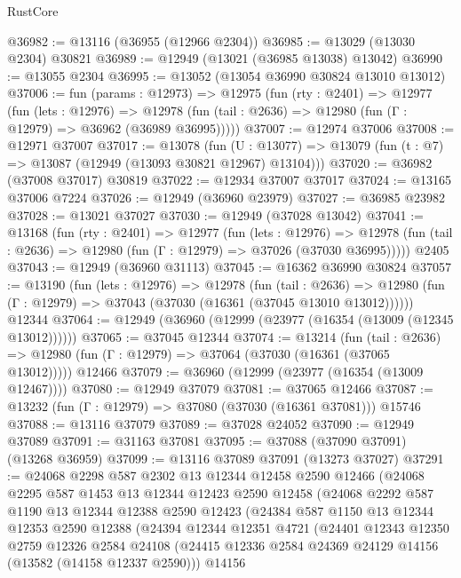 \begin{lexlean}{RustCore}
\begin{coremodule}
@36982 := @13116 (@36955 (@12966 @2304))
@36985 := @13029 (@13030 @2304) @30821
@36989 := @12949 (@13021 (@36985 @13038) @13042)
@36990 := @13055 @2304
@36995 := @13052 (@13054 @36990 @30824 @13010 @13012)
@37006 := fun (params : @12973) =>
  @12975
    (fun (rty : @2401) =>
    @12977
      (fun (lets : @12976) =>
      @12978 (fun (tail : @2636) => @12980 (fun (Γ : @12979) => @36962 (@36989 @36995)))))
@37007 := @12974 @37006
@37008 := @12971 @37007
@37017 := @13078
    (fun (U : @13077) => @13079 (fun (t : @7) => @13087 (@12949 (@13093 @30821 @12967) @13104)))
@37020 := @36982 (@37008 @37017) @30819
@37022 := @12934 @37007 @37017
@37024 := @13165 @37006 @7224
@37026 := @12949 (@36960 @23979)
@37027 := @36985 @23982
@37028 := @13021 @37027
@37030 := @12949 (@37028 @13042)
@37041 := @13168
    (fun (rty : @2401) =>
    @12977
      (fun (lets : @12976) =>
      @12978 (fun (tail : @2636) => @12980 (fun (Γ : @12979) => @37026 (@37030 @36995)))))
    @2405
@37043 := @12949 (@36960 @31113)
@37045 := @16362 @36990 @30824
@37057 := @13190
    (fun (lets : @12976) =>
    @12978
      (fun (tail : @2636) =>
      @12980 (fun (Γ : @12979) => @37043 (@37030 (@16361 (@37045 @13010 @13012))))))
    @12344
@37064 := @12949 (@36960 (@12999 (@23977 (@16354 (@13009 (@12345 @13012))))))
@37065 := @37045 @12344
@37074 := @13214
    (fun (tail : @2636) => @12980 (fun (Γ : @12979) => @37064 (@37030 (@16361 (@37065 @13012)))))
    @12466
@37079 := @36960 (@12999 (@23977 (@16354 (@13009 @12467))))
@37080 := @12949 @37079
@37081 := @37065 @12466
@37087 := @13232 (fun (Γ : @12979) => @37080 (@37030 (@16361 @37081))) @15746
@37088 := @13116 @37079
@37089 := @37028 @24052
@37090 := @12949 @37089
@37091 := @31163 @37081
@37095 := @37088 (@37090 @37091) (@13268 @36959)
@37099 := @13116 @37089 @37091 (@13273 @37027)
@37291 := @24068
    @2298
    @587
    @2302
    @13
    @12344
    @12458
    @2590
    @12466
    (@24068
      @2295
      @587
      @1453
      @13
      @12344
      @12423
      @2590
      @12458
      (@24068
        @2292
        @587
        @1190
        @13
        @12344
        @12388
        @2590
        @12423
        (@24384
          @587
          @1150
          @13
          @12344
          @12353
          @2590
          @12388
          (@24394
            @12344
            @12351
            @4721
            (@24401
              @12343
              @12350
              @2759
              @12326
              @2584
              @24108
              (@24415 @12336 @2584 @24369 @24129 @14156 (@13582 (@14158 @12337 @2590)))
              @14156

\end{coremodule}
\end{lexlean}
